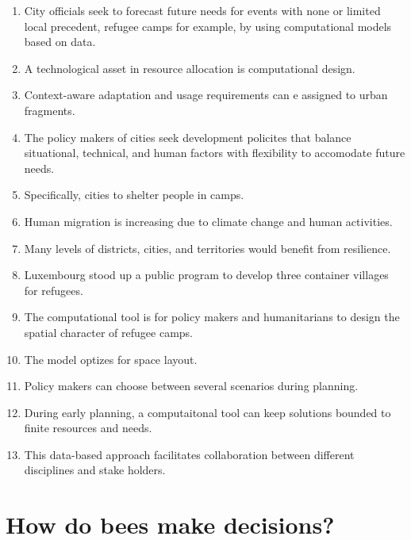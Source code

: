 \documentclass[a4paper,11pt]{article}
\begin{document}
\begin{enumerate}

\item City officials seek to forecast future needs for events with none or limited local precedent, refugee camps for example, by using computational models based on data. 

\item A technological asset in resource allocation is computational design. 
\item Context-aware adaptation and usage requirements can e assigned to urban fragments. 
\item The policy makers of cities seek development policites that balance situational, technical, and human factors with flexibility to accomodate future needs. 
\item Specifically, cities to shelter people in camps. 
\item Human migration is increasing due to climate change and human activities. 
\item Many levels of districts, cities, and territories would benefit from resilience. 
\item Luxembourg stood up a public program to develop three container villages for refugees. 
\item The computational tool is for policy makers and humanitarians to design the spatial character of refugee camps. 
\item The model optizes for space layout. 
\item Policy makers can choose between several scenarios during planning. 
\item During early planning, a computaitonal tool can keep solutions bounded to finite resources and needs. 
\item This data-based approach facilitates collaboration between different disciplines and stake holders.  


\end{enumerate}

\section{How do bees make decisions?}
\end{document}
